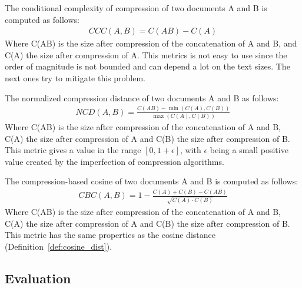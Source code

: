 \begin{definition}
  The conditional complexity of compression of two documents A and B is computed as follows:
  \begin{gather*}
    CCC(A, B) = C(AB) - C(A)
  \end{gather*}
  Where C(AB) is the size after compression of the concatenation of A and B, and C(A) the size after compression of A.
  This metrics is not easy to use since the order of magnitude is not bounded and can depend a lot on the text sizes.
  The next ones try to mitigate this problem.
\end{definition}

\begin{definition}
  The normalized compression distance of two documents A and B as follows:
  \begin{gather*}
    NCD(A, B) = \frac{C(AB) - \min(C(A), C(B))}{\max(C(A), C(B))}
  \end{gather*}
  Where C(AB) is the size after compression of the concatenation of A and B, C(A) the size after compression of A and C(B) the size after compression of B.
  This metric gives a value in the range $\left[0, 1+\epsilon\right]$, with $\epsilon$ being a small positive value created by the imperfection of compression algorithms.
\end{definition}

\begin{definition}
  The compression-based cosine of two documents A and B is computed as follows:
  \begin{gather*}
    CBC(A, B) = 1 - \frac{C(A) + C(B) - C(AB)}{\sqrt{C(A) \cdot C(B)}}
  \end{gather*}
  Where C(AB) is the size after compression of the concatenation of A and B, C(A) the size after compression of A and C(B) the size after compression of B.
  This metric has the same properties as the cosine distance (Definition~\ref{def:cosine_dist}).
\end{definition}


\subsection{Evaluation}

